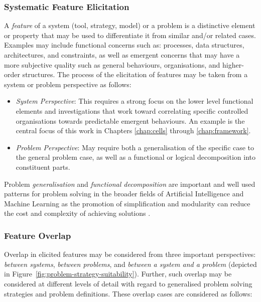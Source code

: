 %
%
\subsubsection{Systematic Feature Elicitation}
A \emph{feature} of a system (tool, strategy, model) or a problem is a distinctive element or property that may be used to differentiate it from similar and/or related cases. Examples may include functional concerns such as: processes, data structures, architectures, and constraints, as well as emergent concerns that may have a more subjective quality such as general behaviours, organisations, and higher-order structures. The process of the elicitation of features may be taken from a system or problem perspective as follows:

\begin{itemize}
	\item \emph{System Perspective}: This requires a strong focus on the lower level functional elements and investigations that work toward correlating specific controlled organisations towards predictable emergent behaviours. An example is the central focus of this work in Chapters \ref{chap:cells} through \ref{chap:framework}.
	\item \emph{Problem Perspective}: May require both a generalisation of the specific case to the general problem case, as well as a functional or logical decomposition into constituent parts.
\end{itemize}

Problem \emph{generalisation} and \emph{functional decomposition} are important and well used patterns for problem solving in the broader fields of Artificial Intelligence and Machine Learning as the promotion of simplification and modularity can reduce the cost and complexity of achieving solutions \cite{Russell1995, Brooks1986}.

%
%
\subsubsection{Feature Overlap}
Overlap in elicited features may be considered from three important perspectives: \emph{between systems}, \emph{between problems}, and \emph{between a system and a problem} (depicted in Figure~\ref{fig:problem-strategy-suitability}). Further, such overlap may be considered at different levels of detail with regard to generalised problem solving strategies and problem definitions.
These overlap cases are considered as follows:

